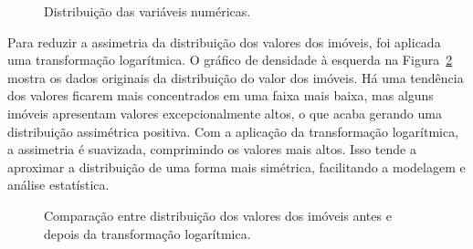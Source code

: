 \documentclass[
  12pt,
  a4paper,
]{scrreprt}
\begin{document}
\begin{figure}


\caption{\label{fig-violin}Distribuição das variáveis numéricas.}

\end{figure}%

\vspace{12pt}

Para reduzir a assimetria da distribuição dos valores dos imóveis, foi
aplicada uma transformação logarítmica. O gráfico de densidade à
esquerda na Figura~\ref{fig-densitarg} mostra os dados originais da
distribuição do valor dos imóveis. Há uma tendência dos valores ficarem
mais concentrados em uma faixa mais baixa, mas alguns imóveis apresentam
valores excepcionalmente altos, o que acaba gerando uma distribuição
assimétrica positiva. Com a aplicação da transformação logarítmica, a
assimetria é suavizada, comprimindo os valores mais altos. Isso tende a
aproximar a distribuição de uma forma mais simétrica, facilitando a
modelagem e análise estatística.

\begin{figure}


\caption{\label{fig-densitarg}Comparação entre distribuição dos valores
dos imóveis antes e depois da transformação logarítmica.}

\end{figure}%
\end{document}

